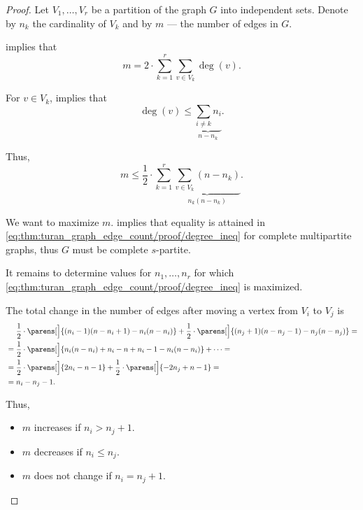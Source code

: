\begin{proof}
  Let \( V_1, \ldots, V_r \) be a partition of the graph \( G \) into independent sets. Denote by \( n_k \) the cardinality of \( V_k \) and by \( m \) --- the number of edges in \( G \).

   implies that
  \begin{equation*}
    m = 2 \cdot \sum_{k=1}^r \sum_{v \in V_k} \deg(v).
  \end{equation*}

  For \( v \in V_k \),  implies that
  \begin{equation*}
    \deg(v) \leq \underbrace{\sum_{i \neq k} n_i}_{n - n_k}.
  \end{equation*}

  Thus,
  \begin{equation}\label{eq:thm:turan_graph_edge_count/proof/degree_ineq}
    m \leq \frac 1 2 \cdot \sum_{k=1}^r \underbrace{\sum_{v \in V_k} (n - n_k)}_{n_k (n - n_k)}.
  \end{equation}

  We want to maximize \( m \).  implies that equality is attained in \eqref{eq:thm:turan_graph_edge_count/proof/degree_ineq} for complete multipartite graphs, thus \( G \) must be complete \( s \)-partite.

  It remains to determine values for \( n_1, \ldots, n_r \) for which \eqref{eq:thm:turan_graph_edge_count/proof/degree_ineq} is maximized.

  The total change in the number of edges after moving a vertex from \( V_i \) to \( V_j \) is
  \begin{align*}
    &\phantom{{}={}}
    \frac 1 2 \cdot \parens[\Big]{ (n_i - 1)(n - n_i + 1) - n_i(n - n_i) } + \frac 1 2 \cdot \parens[\Big]{ (n_j + 1)(n - n_j - 1) - n_j(n - n_j) }
    = \\ &=
    \frac 1 2 \cdot \parens[\Big]{ n_i(n - n_i) + n_i - n + n_i - 1 - n_i(n - n_i) } + \cdots
    = \\ &=
    \frac 1 2 \cdot \parens[\Big]{ 2n_i - n - 1 } + \frac 1 2 \cdot \parens[\Big]{ -2n_j + n - 1 }
    = \\ &=
    n_i - n_j - 1.
  \end{align*}

  Thus,
  \begin{itemize}
    \item \( m \) increases if \( n_i > n_j + 1 \).
    \item \( m \) decreases if \( n_i \leq n_j \).
    \item \( m \) does not change if \( n_i = n_j + 1 \).
  \end{itemize}


\end{proof}
